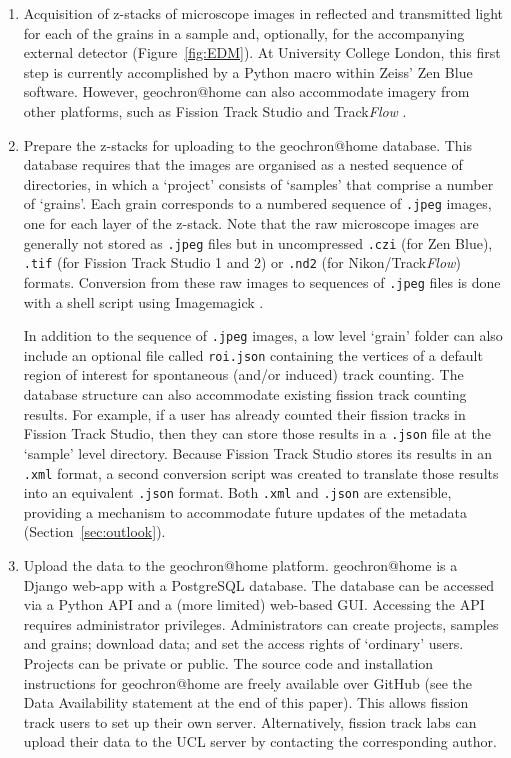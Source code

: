 \documentclass[gchron, manuscript]{copernicus}
\begin{document}
\begin{enumerate}
\item Acquisition of z-stacks of microscope images in reflected and
  transmitted light for each of the grains in a sample and,
  optionally, for the accompanying external detector
  (Figure~\ref{fig:EDM}). At University College London, this first
  step is currently accomplished by a Python macro within Zeiss' Zen
  Blue software.  However, geochron@home can also accommodate imagery
  from other platforms, such as Fission Track Studio
  \citep[Zeiss;][]{gleadow2009} and Track\emph{Flow}
  \citep[Nikon;][]{vanranst2020}.

\item Prepare the z-stacks for uploading to the geochron@home
  database. This database requires that the images are organised as a
  nested sequence of directories, in which a `project' consists of
  `samples' that comprise a number of `grains'.  Each grain
  corresponds to a numbered sequence of \texttt{.jpeg} images, one for
  each layer of the z-stack. Note that the raw microscope images are
  generally not stored as \texttt{.jpeg} files but in uncompressed
  \texttt{.czi} (for Zen Blue), \texttt{.tif} (for Fission Track
  Studio 1 and 2) or \texttt{.nd2} (for Nikon/Track\emph{Flow})
  formats. Conversion from these raw images to sequences of
  \texttt{.jpeg} files is done with a shell script using Imagemagick
  \citep{still2006}.\medskip

  In addition to the sequence of \texttt{.jpeg} images, a low level
  `grain' folder can also include an optional file called
  \texttt{roi.json} containing the vertices of a default region of
  interest for spontaneous (and/or induced) track counting. The
  database structure can also accommodate existing fission track
  counting results.  For example, if a user has already counted their
  fission tracks in Fission Track Studio, then they can store those
  results in a \texttt{.json} file at the `sample' level
  directory. Because Fission Track Studio stores its results in an
  \texttt{.xml} format, a second conversion script was created to
  translate those results into an equivalent \texttt{.json} format.
  Both \texttt{.xml} and \texttt{.json} are extensible, providing a
  mechanism to accommodate future updates of the metadata
  (Section~\ref{sec:outlook}).\medskip
  
\item Upload the data to the geochron@home platform. geochron@home is
  a Django web-app with a PostgreSQL database.  The database can be
  accessed via a Python API and a (more limited) web-based
  GUI. Accessing the API requires administrator
  privileges. Administrators can create projects, samples and grains;
  download data; and set the access rights of `ordinary' users.
  Projects can be private or public. The source code and installation
  instructions for geochron@home are freely available over GitHub (see
  the Data Availability statement at the end of this paper). This
  allows fission track users to set up their own
  server. Alternatively, fission track labs can upload their data to
  the UCL server by contacting the corresponding author.


\end{enumerate}
\end{document}

